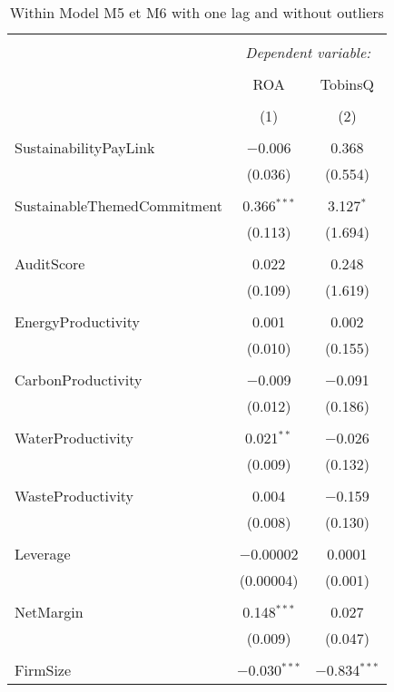\documentclass[]{article}
\begin{document}
\begin{table}[h] \centering 
  \caption{Within Model M5 et M6 with one lag and without outliers} 
  \label{Plm} 
\begin{tabular}{@{\extracolsep{5pt}}lcc} 
\\[-1.8ex]\hline 
\hline \\[-1.8ex] 
 & \multicolumn{2}{c}{\textit{Dependent variable:}} \\ 
\cline{2-3} 
\\[-1.8ex] & ROA & TobinsQ \\ 
\\[-1.8ex] & (1) & (2)\\ 
\hline \\[-1.8ex] 
 SustainabilityPayLink & $-$0.006 & 0.368 \\ 
  & (0.036) & (0.554) \\ 
  & & \\ 
 SustainableThemedCommitment & 0.366$^{***}$ & 3.127$^{*}$ \\ 
  & (0.113) & (1.694) \\ 
  & & \\ 
 AuditScore & 0.022 & 0.248 \\ 
  & (0.109) & (1.619) \\ 
  & & \\ 
 EnergyProductivity & 0.001 & 0.002 \\ 
  & (0.010) & (0.155) \\ 
  & & \\ 
 CarbonProductivity & $-$0.009 & $-$0.091 \\ 
  & (0.012) & (0.186) \\ 
  & & \\ 
 WaterProductivity & 0.021$^{**}$ & $-$0.026 \\ 
  & (0.009) & (0.132) \\ 
  & & \\ 
 WasteProductivity & 0.004 & $-$0.159 \\ 
  & (0.008) & (0.130) \\ 
  & & \\ 
 Leverage & $-$0.00002 & 0.0001 \\ 
  & (0.00004) & (0.001) \\ 
  & & \\ 
 NetMargin & 0.148$^{***}$ & 0.027 \\ 
  & (0.009) & (0.047) \\ 
  & & \\ 
 FirmSize & $-$0.030$^{***}$ & $-$0.834$^{***}$ \\ 

\end{tabular}
\end{table}
\end{document}
